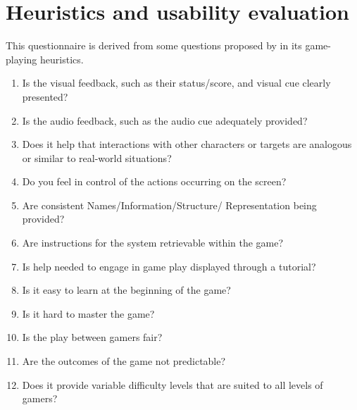 \section{Heuristics and usability evaluation}

This questionnaire is derived from some questions proposed by \cite{Song2007} in its game-playing heuristics.

\begin{enumerate}
\item                        Is the visual feedback, such as their status/score, and visual cue clearly presented?
\item                        Is the audio feedback, such as the audio cue adequately provided?
\item                        Does it help that interactions with other characters or targets are analogous or similar to real-world situations?
\item                        Do you feel in control of the actions occurring on the screen?
\item                        Are consistent Names/Information/Structure/ Representation being provided?
\item                        Are instructions for the system retrievable within the game?
\item                        Is help needed to engage in game play displayed through a tutorial?
\item                        Is it easy to learn at the beginning of the game?
\item                        Is it hard to master the game?
\item                        Is the play between gamers fair?
\item                        Are the outcomes of the game not predictable?
\item                        Does it provide variable difficulty levels that are suited to all levels of gamers?
\end{enumerate}
\cite{Song2007}


